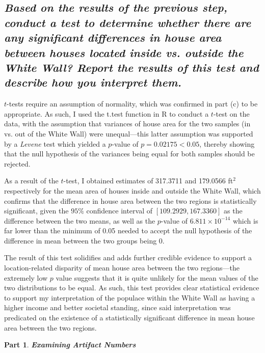 \documentclass[answers]{exam}
\newtheorem{problem}{Part}
\begin{document}
\begin{parts}
\part{\textit{Based on the results of the previous step, conduct a test to determine whether there are any significant differences in house area between houses located inside vs. outside the White Wall? Report the results of this test and describe how you interpret them.}}

\color{nr} \quad\quad $t$-tests require an assumption of normality, which was confirmed in part (c) to be appropriate. As such, I used the t.test function in R to conduct a $t$-test on the data, with the assumption that variances of house area for the two samples (in vs. out of the White Wall) were unequal---this latter assumption was supported by a \textit{Levene} test which yielded a $p$-value of $p = 0.02175 < 0.05$, thereby showing that the null hypothesis of the variances being equal for both samples should be rejected.

\quad\quad As a result of the $t$-test, I obtained estimates of 317.3711 and 179.0566 ft$^2$ respectively for the mean area of houses inside and outside the White Wall, which confirms that the difference in house area between the two regions is statistically significant, given the $95\%$ confidence interval of $[109.2929, 167.3360]$ as the difference between the two means, as well as the $p$-value of $6.811\times10^{-14}$ which is far lower than the minimum of 0.05 needed to accept the null hypothesis of the difference in mean between the two groups being 0.

\quad\quad The result of this test solidifies and adds further credible evidence to support a location-related disparity of mean house area between the two regions---the extremely low $p$ value suggests that it is quite unlikely for the mean values of the two distributions to be equal. As such, this test provides clear statistical evidence to support my interpretation of the populace within the White Wall as having a higher income and better societal standing, since said interpretation was predicated on the existence of a statistically significant difference in mean house area between the two regions.
\end{parts}
\begin{problem}
\textbf{Examining Artifact Numbers}
\end{problem}
\end{document}

